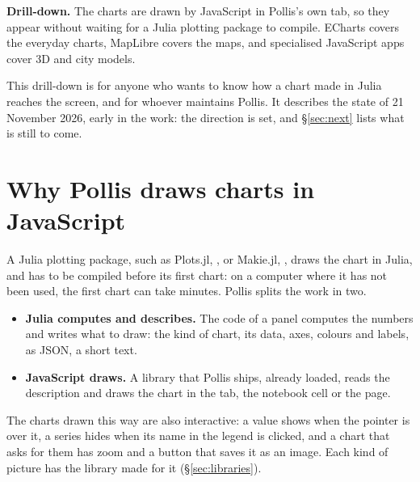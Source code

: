 \begin{nbox}
{\color{amber}\bfseries Drill-down.}\enspace
The charts are drawn by JavaScript in Pollis's own tab, so they appear without waiting for a Julia plotting package to
compile. ECharts covers the everyday charts, MapLibre covers the maps, and specialised JavaScript apps cover 3D and
city models.

This drill-down is for anyone who wants to know how a chart made in Julia reaches the screen, and for whoever
maintains Pollis. It describes the state of 21 November 2026, early in the work: the direction is set, and
\S\ref{sec:next} lists what is still to come.
\end{nbox}

\tableofcontents

\section{Why Pollis draws charts in JavaScript}\label{sec:why}
A Julia plotting package, such as Plots.jl, , or Makie.jl, , draws the chart in Julia, and has to be compiled
before its first chart: on a computer where it has not been used, the first chart can take minutes. Pollis splits the
work in two.
\begin{itemize}
  \item \textbf{Julia computes and describes.} The code of a panel computes the numbers and writes what to draw: the
    kind of chart, its data, axes, colours and labels, as JSON, a short text.
  \item \textbf{JavaScript draws.} A library that Pollis ships, already loaded, reads the description and draws the
    chart in the tab, the notebook cell or the page.
\end{itemize}
The charts drawn this way are also interactive: a value shows when the pointer is over it, a series hides when its
name in the legend is clicked, and a chart that asks for them has zoom and a button that saves it as an image. Each kind of picture has the library
made for it (\S\ref{sec:libraries}).

